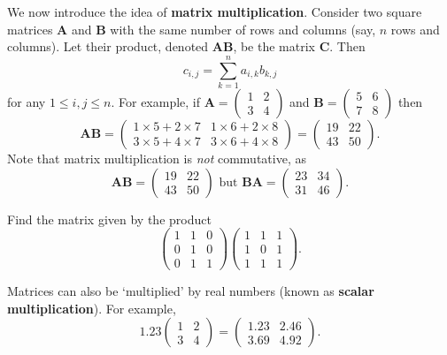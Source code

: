 We now introduce the idea of \textbf{matrix multiplication}. Consider two square matrices \textbf{A} and \textbf{B} with the same number of rows and columns (say, $n$ rows and columns). Let their product, denoted \textbf{AB}, be the matrix \textbf{C}. Then
\[
    c_{i,j} = \sum_{k=1}^n a_{i,k}b_{k,j}
\]
for any $1 \leq i, j \leq n$. For example, if $\textbf{A} = \begin{pmatrix}1 & 2\\3 & 4\end{pmatrix}$ and $\textbf{B} = \begin{pmatrix}5 & 6\\7 & 8\end{pmatrix}$ then
\[
    \textbf{AB} = \begin{pmatrix}1\times5+2\times7 & 1\times6+2\times8\\3\times5+4\times7 & 3\times6+4\times8\end{pmatrix}
    = \begin{pmatrix}19 & 22\\43 & 50\end{pmatrix}.
\]
Note that matrix multiplication is \textit{not} commutative, as
\[
    \textbf{AB} = \begin{pmatrix}19 & 22\\43 & 50\end{pmatrix} \text{ but } \textbf{BA} = \begin{pmatrix}23 & 34\\31 & 46\end{pmatrix}.
\]

\begin{exercise}
    Find the matrix given by the product
    \[
        \begin{pmatrix}1&1&0\\0&1&0\\0&1&1\end{pmatrix}\begin{pmatrix}1&1&1\\1&0&1\\1&1&1\end{pmatrix}.
    \]
\end{exercise}

Matrices can also be `multiplied' by real numbers (known as \textbf{scalar multiplication}). For example,
\[
    1.23\begin{pmatrix}1 & 2\\3 & 4\end{pmatrix} = \begin{pmatrix}1.23 & 2.46\\3.69 & 4.92\end{pmatrix}.
\]

